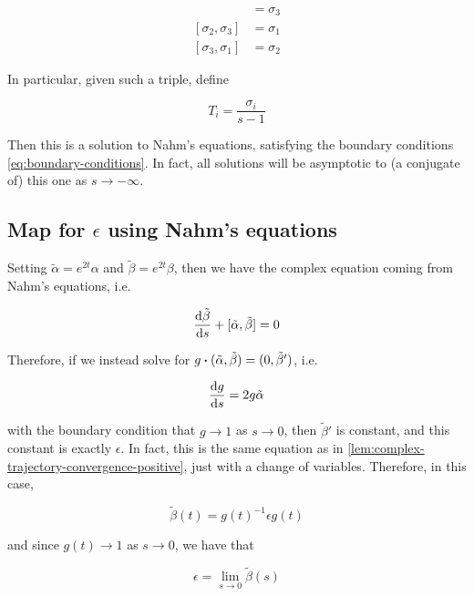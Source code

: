 \documentclass{report}
\begin{document}
\begin{align*}
    [\sigma_1, \sigma_2] &= \sigma_3 \\
    [\sigma_2, \sigma_3] &= \sigma_1 \\
    [\sigma_3, \sigma_1] &= \sigma_2
\end{align*}

In particular, given such a triple, define

\begin{equation}
    \label{eq:nahm-asymptotic-solution}
    T_i = \frac{\sigma_i}{s-1}
\end{equation}

Then this is a solution to Nahm's equations, satisfying the boundary conditions \cref{eq:boundary-conditions}. In fact, all solutions will be asymptotic to (a conjugate of) this one as \(s \to -\infty\).

\subsection{Map for \(\epsilon\) using Nahm's equations}

Setting \(\tilde\alpha = e^{2t}\alpha\) and \(\tilde\beta = e^{2t}\beta\), then we have the complex equation coming from Nahm's equations, i.e.

\[\dv{\tilde\beta}{s} + [\tilde\alpha, \tilde\beta] = 0\]

Therefore, if we instead solve for \(g \vdot (\tilde\alpha, \tilde\beta) = (0, \tilde\beta')\), i.e.

\[\dv{g}{s} = 2g\tilde\alpha\]

with the boundary condition that \(g \to 1\) as \(s \to 0\), then \(\tilde\beta'\) is constant, and this constant is exactly \(\epsilon\). In fact, this is the same equation as in \cref{lem:complex-trajectory-convergence-positive}, just with a change of variables. Therefore, in this case,

\[\tilde\beta(t) = g(t)^{-1}\epsilon g(t)\]

and since \(g(t) \to 1\) as \(s \to 0\), we have that

\[\epsilon = \lim_{s \to 0}\tilde\beta(s)\]
\end{document}
